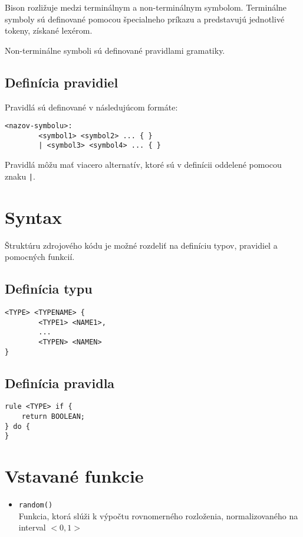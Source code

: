 Bison rozližuje medzi terminálnym a non-terminálnym symbolom. Terminálne symboly sú definované pomocou špecialneho príkazu a predstavujú
jednotlivé tokeny, získané lexérom.

Non-terminálne symboli sú definované pravidlami gramatiky. 
\subsection{Definícia pravidiel}
Pravidlá sú definované v následujúcom formáte:

\begin{verbatim}
<nazov-symbolu>:
        <symbol1> <symbol2> ... { } 
        | <symbol3> <symbol4> ... { }
\end{verbatim}

Pravidlá môžu mať viacero alternatív, ktoré sú v definícii oddelené pomocou znaku \texttt{|}. 




\section{Syntax}

Štruktúru zdrojového kódu je možné rozdeliť na definíciu typov, pravidiel a pomocných funkcií.

\subsection{Definícia typu}

\begin{verbatim}
<TYPE> <TYPENAME> { 
        <TYPE1> <NAME1>,	
        ...
        <TYPEN> <NAMEN>	
}
\end{verbatim}

\subsection{Definícia pravidla}

\begin{verbatim}
rule <TYPE> if { 
	return BOOLEAN;
} do {
}
\end{verbatim}

\section{Vstavané funkcie}

\begin{itemize}
\item \texttt{random()} \\
	Funkcia, ktorá slúži k výpočtu rovnomerného rozloženia, normalizovaného na interval $<0,1>$
\end{itemize}
